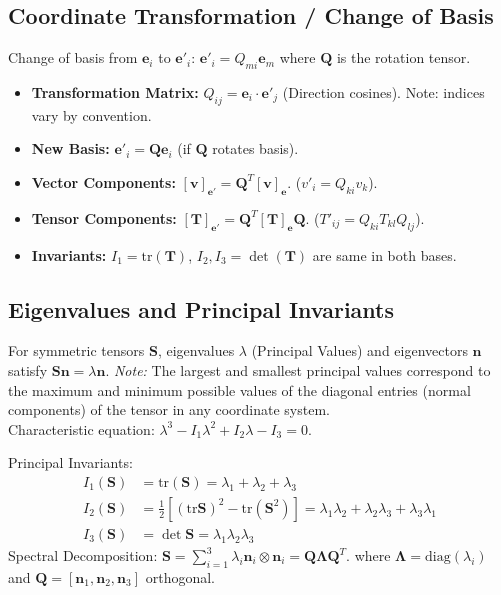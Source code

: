 \documentclass[10pt,twocolumn, a4paper]{article}
\begin{document}
\subsection{Coordinate Transformation / Change of Basis}
Change of basis from $\bm{e}_i$ to $\bm{e}'_i$: $\bm{e}'_i = Q_{mi} \bm{e}_m$ where $\bm{Q}$ is the rotation tensor.
\begin{itemize}
    \item \textbf{Transformation Matrix:} $Q_{ij} = \bm{e}_i \cdot \bm{e}'_j$ (Direction cosines). Note: indices vary by convention.
    \item \textbf{New Basis:} $\bm{e}'_i = \mathbf{Q} \bm{e}_i$ (if $\mathbf{Q}$ rotates basis).
    \item \textbf{Vector Components:} $[\bm{v}]_{\bm{e}'} = \bm{Q}^T [\bm{v}]_{\bm{e}}$. ($v'_i = Q_{ki} v_k$).
    \item \textbf{Tensor Components:} $[\bm{T}]_{\bm{e}'} = \bm{Q}^T [\bm{T}]_{\bm{e}} \bm{Q}$. ($T'_{ij} = Q_{ki} T_{kl} Q_{lj}$).
    \item \textbf{Invariants:} $I_1 = \text{tr}(\bm{T})$, $I_2, I_3 = \det(\bm{T})$ are same in both bases.
\end{itemize}

\subsection{Eigenvalues and Principal Invariants}
For symmetric tensors $\bm{S}$, eigenvalues $\lambda$ (Principal Values) and eigenvectors $\bm{n}$ satisfy $\bm{S}\bm{n} = \lambda \bm{n}$.
\textit{Note:} The largest and smallest principal values correspond to the maximum and minimum possible values of the diagonal entries (normal components) of the tensor in any coordinate system. \\
Characteristic equation: $\lambda^3 - I_1 \lambda^2 + I_2 \lambda - I_3 = 0$.

Principal Invariants:
\begin{align*}
    I_1(\bm{S}) &= \text{tr}(\bm{S}) = \lambda_1 + \lambda_2 + \lambda_3 \\
    I_2(\bm{S}) &= \frac{1}{2}[(\text{tr}\bm{S})^2 - \text{tr}(\bm{S}^2)] = \lambda_1\lambda_2 + \lambda_2\lambda_3 + \lambda_3\lambda_1 \\
    I_3(\bm{S}) &= \det \bm{S} = \lambda_1\lambda_2\lambda_3
\end{align*}
Spectral Decomposition: $\bm{S} = \sum_{i=1}^3 \lambda_i \bm{n}_i \otimes \bm{n}_i = \bm{Q} \bm{\Lambda} \bm{Q}^T$.
where $\bm{\Lambda} = \text{diag}(\lambda_i)$ and $\bm{Q} = [\bm{n}_1, \bm{n}_2, \bm{n}_3] $ orthogonal.
\end{document}
